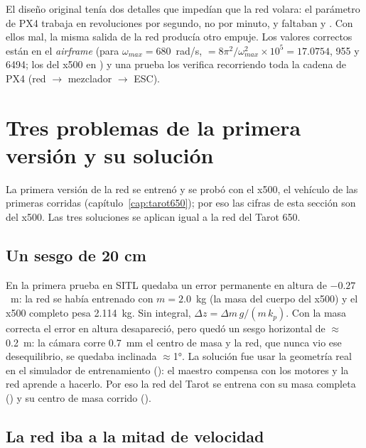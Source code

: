 \begin{leccion}
El diseño original tenía dos detalles que impedían que la red volara: el parámetro
 de PX4 trabaja en revoluciones por segundo, no por minuto, y faltaban
 y . Con ellos mal, la misma salida de la red producía otro empuje.
Los valores correctos están en el \emph{airframe}  (para
$\omega_{max} = 680$~rad/s,  $= 8\pi^2/\omega_{max}^2\times10^5 = 17.0754$,
 955 y  6494; los del x500 en ) y una prueba los
verifica recorriendo toda la cadena de PX4 (red $\rightarrow$ mezclador $\rightarrow$ ESC).
\end{leccion}

\section{Tres problemas de la primera versión y su solución}

La primera versión de la red se entrenó y se probó con el x500, el vehículo de las primeras corridas
(capítulo~\ref{cap:tarot650}); por eso las cifras de esta sección son del x500. Las tres soluciones se
aplican igual a la red del Tarot 650.

\subsection{Un sesgo de 20 cm}

En la primera prueba en SITL quedaba un error permanente en altura de $-0.27$~m: la red se había
entrenado con $m = 2.0$~kg (la masa del cuerpo del x500) y el x500 completo pesa 2.114~kg. Sin integral, $\Delta z = \Delta m\,g/(m\,k_p)$.
Con la masa correcta el error en altura desapareció, pero quedó un sesgo horizontal de $\approx$0.2~m: la
cámara corre 0.7~mm el centro de masa y la red, que nunca vio ese desequilibrio, se quedaba inclinada
$\approx$1°. La solución fue usar la geometría real en el simulador de entrenamiento (): el
maestro compensa con los motores y la red aprende a hacerlo. Por eso la red del Tarot se entrena con su
masa completa () y su centro de masa corrido ().

\subsection{La red iba a la mitad de velocidad}

